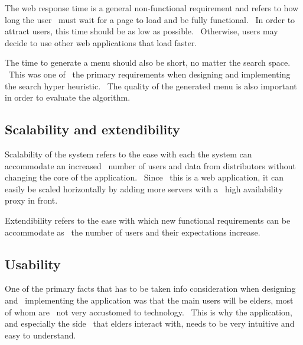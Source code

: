 The web response time is a general non-functional requirement and refers to how long the user \
must wait for a page to load and be fully functional. \
In order to attract users, this time should be as low as possible. \
Otherwise, users may decide to use other web applications that load faster.

The time to generate a menu should also be short, no matter the search space. \
This was one of \
the primary requirements when designing and implementing the search hyper heuristic. \
The quality of the generated menu is also important in order to evaluate the algorithm.

\subsection{Scalability and extendibility}
\label{subsec:specification-scalability}
Scalability of the system refers to the ease with each the system can accommodate an increased \
number of users and data from distributors without changing the core of the application. \
Since \
this is a web application, it can easily be scaled horizontally by adding more servers with a \
high availability proxy in front.

Extendibility refers to the ease with which new functional requirements can be accommodate as \
the number of users and their expectations increase.

\subsection{Usability}
\label{subsec:specification-usability}
One of the primary facts that has to be taken info consideration when designing and \
implementing the application was that the main users will be elders, most of whom are \
not very accustomed to technology. \
This is why the application, and especially the side \
that elders interact with, needs to be very intuitive and easy to understand.